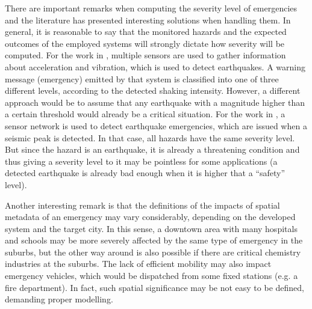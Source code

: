 \begin{refsection}
There are important remarks when computing the severity level of emergencies and the literature has presented interesting solutions when handling them. In general, it is reasonable to say that the monitored hazards and the expected outcomes of the employed systems will strongly dictate how severity will be computed. For the work in \cite{iotEarthquake2}, multiple sensors are used to gather information about acceleration and vibration, which is used to detect earthquakes. A warning message (emergency) emitted by that system is classified into one of three different levels, according to the detected shaking intensity. However, a different approach would be to assume that any earthquake with a magnitude higher than a certain threshold would already be a critical situation. For the work in \cite{iotEarthquake3}, a sensor network is used to detect earthquake emergencies, which are issued when a seismic peak is detected. In that case, all hazards have the same severity level. But since the hazard is an earthquake, it is already a threatening condition and thus giving a severity level to it may be pointless for some applications (a detected earthquake is already bad enough when it is higher that a ``safety'' level).

Another interesting remark is that the definitions of the impacts of spatial metadata of an emergency may vary considerably, depending on the developed system and the target city. In this sense, a downtown area with many hospitals and schools may be more severely affected by the same type of emergency in the suburbs, but the other way around is also possible if there are critical chemistry industries at the suburbs. The lack of efficient mobility may also impact emergency vehicles, which would be dispatched from some fixed stations (e.g. a fire department). In fact, such spatial significance may be not easy to be defined, demanding proper modelling.


\end{refsection}
